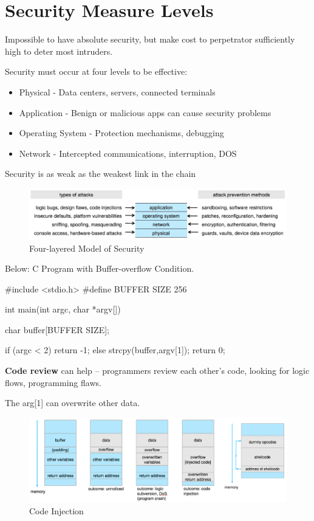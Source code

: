 \section{Security Measure Levels}
Impossible to have absolute security, but make cost to perpetrator sufficiently high to deter most intruders.

Security must occur at four levels to be effective:

\begin{itemize}
    \item Physical - Data centers, servers, connected terminals
    \item Application - Benign or malicious apps can cause security problems
    \item Operating System - Protection mechanisms, debugging
    \item Network - Intercepted communications, interruption, DOS
\end{itemize}
Security is as weak as the weakest link in the chain


\begin{figure}[h!]
    \centering
    \includegraphics[width=0.7\linewidth]{img/dsvvdvd.png}
    \caption{Four-layered Model of Security}
\end{figure}

Below: C Program with Buffer-overflow Condition.

\begin{codeInC}
#include <stdio.h>
#define BUFFER SIZE 256

int main(int argc, char *argv[]){
    char buffer[BUFFER SIZE];
    
    if (argc < 2)
        return -1;
    else {
        strcpy(buffer,argv[1]);
        return 0;
    }
}
\end{codeInC}
\textbf{Code review }can help – programmers review each other’s code, looking for logic flows, programming flaws.

The arg[1] can overwrite other data.


\begin{figure}[h!]
    \centering
    \includegraphics[width=0.9\linewidth]{img/dfnbggdngn.png}
    \caption{Code Injection}
\end{figure}

